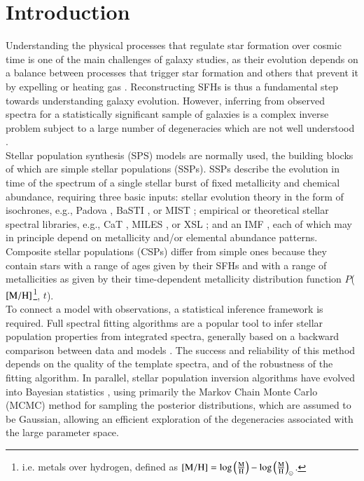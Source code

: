 \section{Introduction}

 Understanding the physical processes that regulate star formation over cosmic time is one of the main challenges of galaxy studies, as their evolution depends on a balance between processes that trigger star formation and others that prevent it by expelling or heating gas \citep[e.g.][]{Franx90,Silk_2012, lilly13, nacho}. Reconstructing SFHs is thus a fundamental step towards understanding galaxy evolution. However, inferring  from observed spectra for a statistically significant sample of galaxies is a complex inverse problem subject to a large number of degeneracies which are not well understood \citep[e.g.][]{worthey92, Ocvirk, Conroy_2009}. \\

  Stellar population synthesis (SPS) models are normally used, the building blocks of which are simple stellar populations (SSPs). SSPs describe the evolution in time of the spectrum of a single stellar burst of fixed metallicity and chemical abundance, requiring three basic inputs: stellar evolution theory in the form of isochrones, e.g., Padova \citep{Girardi_2000}, BaSTI \citep{Pietrinferni_2006}, or MIST \citep{Choi_2016};  empirical or  theoretical stellar spectral libraries, e.g., CaT \citep{Cenarro_2001}, MILES \citep{Vazdekis_2010}, or XSL \citep{Gonneau_2020}; and an IMF \citep{salpeter95,Kroupa_2001,Chabrier_2003}, each of which may in principle depend on metallicity and/or elemental abundance patterns.  Composite stellar populations (CSPs) differ from simple ones because they contain stars with a range of ages given by their SFHs and with a range of metallicities as given by their time-dependent metallicity distribution function $P$($\rm{[M/H]}$\footnote{i.e. metals over hydrogen, defined as $\rm{[M/H]}=\log \left(\frac{\rm M}{\rm H}\right)-\log \left(\frac{\rm M}{\rm H}\right)_{\odot}$.}, $t$).\\



To connect a model with observations, a statistical inference framework is required. Full spectral fitting algorithms are a popular tool to infer stellar population properties from integrated spectra, generally based on a backward comparison between data and models  \citep[e.g.][]{starlight,Ocvirk,vespa,firefly, Cappellari2022}. The success and reliability of this method depends on the quality of the template spectra, and of the robustness of the fitting algorithm. In parallel, stellar population inversion algorithms have evolved into Bayesian statistics \citep[e.g.][]{Mart_n_Navarro_2019,Johnson_2021,2024maciata, 2024wang}, using primarily the Markov Chain Monte Carlo (MCMC) method for sampling the posterior distributions, which are assumed to be Gaussian, allowing an efficient exploration of the degeneracies associated with the large parameter space.\\ 

